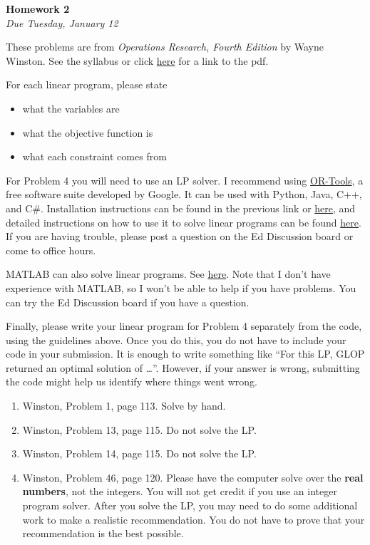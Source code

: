 \documentclass[oneside,12pt]{memoir}
\begin{document}
\begin{center}
\textbf{\large Homework 2} \\
\emph{Due Tuesday, January 12}
\end{center}

These problems are from \emph{Operations Research, Fourth Edition} by Wayne Winston. See the syllabus or click \href{https://ia801301.us.archive.org/16/items/OperationalResearchWinstonWayne/Operational-Research-Winston-Wayne.pdf}{here} for a link to the pdf.

For each linear program, please state
\begin{itemize}
	\item what the variables are
	\item what the objective function is
	\item what each constraint comes from
\end{itemize}

For Problem 4 you will need to use an LP solver. I recommend using \href{https://developers.google.com/optimization}{OR-Tools}, a free software suite developed by Google. It can be used with Python, Java, C++, and C\#. Installation instructions can be found in the previous link or \href{https://developers.google.com/optimization/install}{here}, and detailed instructions on how to use it to solve linear programs can be found \href{https://developers.google.com/optimization/lp/lp_example}{here}. If you are having trouble, please post a question on the Ed Discussion board or come to office hours.

MATLAB can also solve linear programs. See \href{https://www.mathworks.com/help/optim/linear-programming-and-mixed-integer-linear-programming.html?s_tid=CRUX_lftnav}{here}. Note that I don't have experience with MATLAB, so I won't be able to help if you have problems. You can try the Ed Discussion board if you have a question.

Finally, please write your linear program for Problem 4 separately from the code, using the guidelines above. Once you do this, you do not have to include your code in your submission. It  is enough to write something like ``For this LP, GLOP returned an optimal solution of \dots''. However, if your answer is wrong, submitting the code might help us identify where things went wrong.

\begin{enumerate}[leftmargin=*]

\item Winston, Problem 1, page 113. Solve by hand.
\item Winston, Problem 13, page 115. Do not solve the LP.
\item Winston, Problem 14, page 115. Do not solve the LP.
\item Winston, Problem 46, page 120. Please have the computer solve over the \textbf{real numbers}, not the integers. You will not get credit if you use an integer program solver. After you solve the LP, you may need to do some additional work to make a realistic recommendation. You do not have to prove that your recommendation is the best possible.

\end{enumerate}
\end{document}
